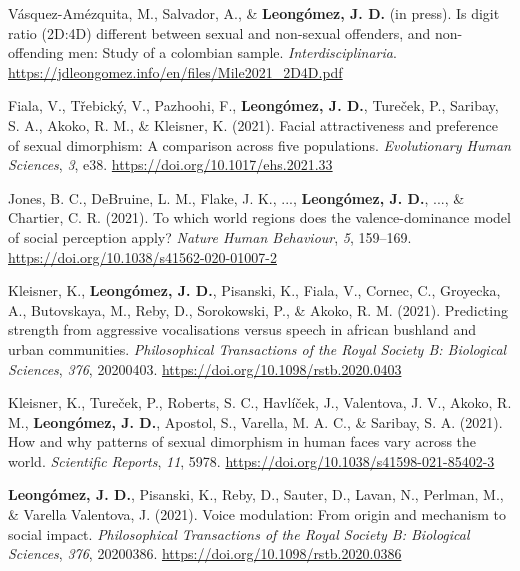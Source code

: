 \documentclass[11pt, a4paper]{awesome-cv}
\begin{document}
\leavevmode{}%
Vásquez-Amézquita, M., Salvador, A., \& \textbf{Leongómez, J. D.} (in
press). Is digit ratio (2D:4D) different between sexual and non-sexual
offenders, and non-offending men: Study of a colombian sample.
\emph{Interdisciplinaria}.
\url{https://jdleongomez.info/en/files/Mile2021_2D4D.pdf}

\leavevmode{}%
Fiala, V., Třebický, V., Pazhoohi, F., \textbf{Leongómez, J. D.},
Tureček, P., Saribay, S. A., Akoko, R. M., \& Kleisner, K. (2021).
Facial attractiveness and preference of sexual dimorphism: A comparison
across five populations. \emph{Evolutionary Human Sciences}, \emph{3},
e38. \url{https://doi.org/10.1017/ehs.2021.33}

\leavevmode{}%
Jones, B. C., DeBruine, L. M., Flake, J. K., ...,
\textbf{Leongómez, J. D.}, ..., \& Chartier, C. R. (2021). {To which
world regions does the valence-dominance model of social perception
apply?} \emph{Nature Human Behaviour}, \emph{5}, 159--169.
\url{https://doi.org/10.1038/s41562-020-01007-2}

\leavevmode{}%
Kleisner, K., \textbf{Leongómez, J. D.}, Pisanski, K., Fiala, V.,
Cornec, C., Groyecka, A., Butovskaya, M., Reby, D., Sorokowski, P., \&
Akoko, R. M. (2021). Predicting strength from aggressive vocalisations
versus speech in african bushland and urban communities.
\emph{Philosophical Transactions of the Royal Society B: Biological
Sciences}, \emph{376}, 20200403.
\url{https://doi.org/10.1098/rstb.2020.0403}

\leavevmode{}%
Kleisner, K., Tureček, P., Roberts, S. C., Havlíček, J., Valentova, J.
V., Akoko, R. M., \textbf{Leongómez, J. D.}, Apostol, S., Varella, M. A.
C., \& Saribay, S. A. (2021). How and why patterns of sexual dimorphism
in human faces vary across the world. \emph{Scientific Reports},
\emph{11}, 5978. \url{https://doi.org/10.1038/s41598-021-85402-3}

\leavevmode{}%
\textbf{Leongómez, J. D.}, Pisanski, K., Reby, D., Sauter, D., Lavan,
N., Perlman, M., \& Varella Valentova, J. (2021). Voice modulation:
{From} origin and mechanism to social impact. \emph{Philosophical
Transactions of the Royal Society B: Biological Sciences}, \emph{376},
20200386. \url{https://doi.org/10.1098/rstb.2020.0386}
\end{document}
